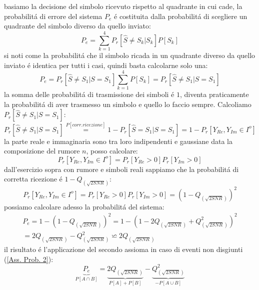                 basiamo la decisione del simbolo ricevuto rispetto al quadrante in cui cade, la probabilitá di errore del 
                sistema $P_e$ é costituita dalla probabilitá di scegliere un quadrante del simbolo diverso da quello inviato:
                \[
                    P_e = \sum_{k=1}^{4} P_r[\hat{S} \neq S_k | S_k]P[S_k]
                \]
                si noti come la probabilitá che il simbolo ricada in un quadrante diverso da quello inviato é identica per tutti i casi, 
                quindi basta calcolarne solo una: 
                \[
                    P_e = P_r[\hat{S} \neq S_1 | S=S_1]\sum_{k=1}^{4} P[S_k] = P_r[\hat{S} \neq S_1 | S=S_1]
                \]
                la somma delle probabilitá di trasmissione dei simboli é $1$, diventa praticamente la probabilitá di aver trasmesso un simbolo e quello lo faccio sempre.
                Calcoliamo $P_r[\hat{S} \neq S_1 | S=S_1]$:
                \[
                    P_r[\hat{S} \neq S_1 | S=S_1] \overset{P[corr. ricezione]}{=} 1-P_r[\hat{S} = S_1 | S=S_1] = 1-P_r[Y_{Re},Y_{Im} \in I^o ] 
                \]
                la parte reale e immaginaria sono tra loro indipendenti e gaussiane data la composizione del rumore $n$, posso calcolare:
                \[
                    P_r[Y_{Re},Y_{Im} \in I^o ] = P_r[Y_{Re}>0]P_r[Y_{Im}>0] 
                \]
                dall'esercizio sopra con rumore e simboli reali sappiamo che la probabilitá di corretta ricezione é $1-Q_{(\sqrt{2SNR})}$:
                \[
                    P_r[Y_{Re},Y_{Im} \in I^o ] = P_r[Y_{Re}>0]P_r[Y_{Im}>0] = \left(1-Q_{(\sqrt{2SNR})}\right)^2
                \]
                possiamo calcolare adesso la probabilitá del sistema:
                \begin{gather}
                    P_e = 1-\left(1-Q_{(\sqrt{2SNR})}\right)^2 =1-\left(1-2Q_{(\sqrt{2SNR})}+Q^2_{(\sqrt{2SNR})}\right)^2  \nonumber\\
                        = 2Q_{(\sqrt{2SNR})}-Q^2_{(\sqrt{2SNR})} \backsimeq 2Q_{(\sqrt{2SNR})}\nonumber
                \end{gather}
                il risultato é l'applicazione del secondo assioma in caso di eventi non disgiunti (\ref{Ass. Prob. 2}):
                \[    
                    \underset{P[A\cap B]}{\underbrace{P_e }}=\underset{P[A]+P[B]}{\underbrace{2Q_{(\sqrt{2SNR})}}}-\underset{-P[A\cup B]}{\underbrace{Q^2_{(\sqrt{2SNR})}}} 
                \]
                
          
    